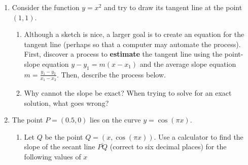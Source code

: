 \documentclass[letterpaper,11pt]{article}
\newif\ifsolutions
\begin{document}
\begin{enumerate}
\begin{enumerate}[label = \alph*.]
    \vspace{1.5in}
\end{enumerate}
\item Consider the function $y=x^2$ and try to draw its tangent line at the point $(1,1)$.
\begin{center}
\end{center}
\newpage
\begin{enumerate}[label = \alph*.]
    \item Although a sketch is nice, a larger goal is to create an equation for the tangent line (perhaps so that a computer may automate the process). First, discover a process to \textbf{estimate} the tangent line using the point-slope equation $y - y_1 = m(x-x_1)$ and the average slope equation $m = \frac{y_1-y_2}{x_1-x_2}$. Then, describe the process below.\\
    \ifsolutions \textcolor{blue} { Insert the point $(1,1)$ in for $(x_1, y_1)$. Then, estimate the slope $m$ near $(1,1)$ using a close point, such as $(1.1,1.21)$. } \fi
    \vfill
    \item Why cannot the slope be exact? When trying to solve for an exact solution, what goes wrong? \\
    \ifsolutions \textcolor{blue} { When using the two same points for the slope, you will divide by zero. } \fi
    \vfill
\end{enumerate}
\newpage
\item The point $P = (0.5,0)$ lies on the curve $y = \cos(\pi x)$.
\begin{enumerate}[label = \alph*.]
    \item Let $Q$ be the point $Q = (x,\cos(\pi x))$. Use a calculator to find the slope of the secant line $\overline{PQ}$ (correct to six decimal places) for the following values of $x$
    \begin{center}
    \begin{tabular}{|p{2in}|p{2in}|}
        \hline

\end{tabular}
\end{center}
\end{enumerate}
\end{enumerate}
\end{document}
